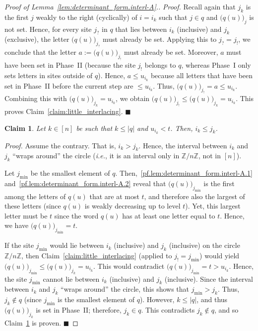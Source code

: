 \documentclass[reqno]{amsart}
\newcommand{\0}{\phantom{c}}
\newcommand{\ZZ}{\mathbb{Z}}
\newenvironment{subproof}{\textit{Proof.} }{\hfill$\blacksquare$\medskip}
\newcommand{\abs}[1]{\left| #1 \right|}
\newcommand{\ive}[1]{\left[ #1 \right]}
\theoremstyle{plain}
\newtheorem{claim}[thm]{Claim}
\theoremstyle{definition}
\numberwithin{equation}{section}
\begin{document}
\begin{proof}[Proof of Lemma~\ref{lem:determinant_form.interl-A}.]
\begin{subproof}
Recall again that $j_k$ is the first $j$ weakly to the right (cyclically) of $i = i_k$ such that $j \in q$ and $\bigl( q(u) \bigr)_j$ is not set.
Hence, for every site $j_{?}$ in $q$ that lies between $i_k$ (inclusive) and $j_k$ (exclusive), the letter $\bigl( q(u) \bigr)_{j_{?}}$ must already be set.
Applying this to $j_{?} = j_{!}$, we conclude that the letter $a := \bigl( q(u) \bigr)_{j_{!}}$ must already be set.
Moreover, $a$ must have been set in Phase~II (because the site $j_{!}$ belongs to $q$, whereas Phase~I only sets letters in sites outside of $q$).
Hence, $a \leq u_{i_k}$ because all letters that have been set in Phase~II before the current step are $\leq u_{i_k}$.
Thus, $\bigl( q(u) \bigr)_{j_{!}} = a \leq u_{i_k}$.
Combining this with $\bigl( q(u) \bigr)_{j_k} = u_{i_k}$, we obtain $\bigl( q(u) \bigr)_{j_{!}} \leq \bigl( q(u) \bigr)_{j_k}=u_{i_k}$.
This proves Claim~\ref{claim:little_interlacing}.
\end{subproof}

\begin{claim}
\label{claim:fixed_k_decreasing_i_from_j}
Let $k\in \ive{n} $ be such that $k\leq \abs{q}$ and $u_{i_k} < t$.
Then, $i_k \leq j_k$.
\end{claim}

\begin{subproof}
Assume the contrary. That is, $i_k>j_k$.
Hence, the interval between $i_k$ and $j_k$ ``wraps around'' the circle (\textit{i.e.}, it is an interval only
in $\ZZ/n\ZZ$, not in $\ive{n} $).

Let $j_{\min }$ be the smallest element of $q$.
Then,~\eqref{pf.lem:determinant_form.interl-A.1} and~\eqref{pf.lem:determinant_form.interl-A.2} reveal that $\bigl( q(u) \bigr)_{j_{\min}}$ is the first among the letters of $q(u)$ that are at most $t$, and therefore also the largest of these letters (since $q(u)$ is weakly decreasing up to level $t$).
Yet, this largest letter must be $t$ since the word $q(u)$ has at least one letter equal to $t$.
Hence, we have $\bigl( q(u) \bigr)_{j_{\min}} = t$.

If the site $j_{\min }$ would lie between $i_k$ (inclusive) and $j_k$ (inclusive) on the circle $\ZZ/n\ZZ$, then Claim~\ref{claim:little_interlacing} (applied to $j_{!} = j_{\min}$) would yield $\bigl( q(u) \bigr)_{j_{\min}} \leq \bigl( q(u) \bigr)_{j_k} = u_{i_k}$.
This would contradict $\bigl( q(u) \bigr)_{j_{\min}} = t > u_{i_k}$.
Hence, the site $j_{\min}$ cannot lie between $i_k$ (inclusive) and $j_k$ (inclusive).
Since the interval between $i_k$ and $j_k$ ``wraps around'' the circle, this shows that $j_{\min} > j_k$.
Thus, $j_k\notin q$ (since $j_{\min}$ is the smallest element of $q$).
However, $k \leq \abs{q}$, and thus $\bigl( q(u) \bigr)_{j_k}$ is set in Phase~II; therefore, $j_k\in q$.
This contradicts $j_k\notin q$, and so Claim~\ref{claim:fixed_k_decreasing_i_from_j} is proven.
\end{subproof}


\end{proof}
\end{document}
